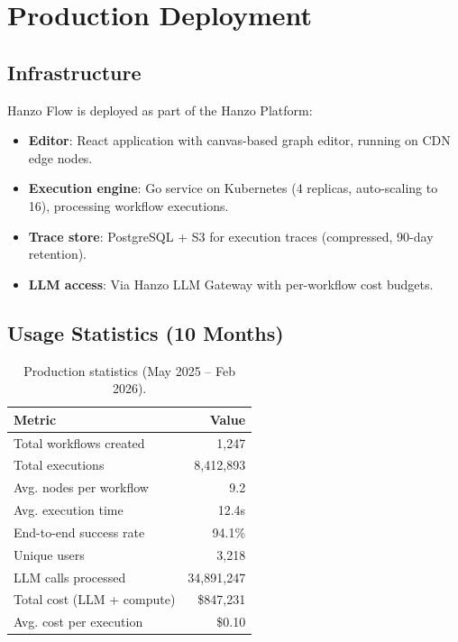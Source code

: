 \section{Production Deployment}

\label{sec:production}

\subsection{Infrastructure}

Hanzo Flow is deployed as part of the Hanzo Platform:

\begin{itemize}[leftmargin=1.1em]
    \item \textbf{Editor}: React application with canvas-based graph editor, running on CDN edge nodes.
    \item \textbf{Execution engine}: Go service on Kubernetes (4 replicas, auto-scaling to 16), processing workflow executions.
    \item \textbf{Trace store}: PostgreSQL + S3 for execution traces (compressed, 90-day retention).
    \item \textbf{LLM access}: Via Hanzo LLM Gateway with per-workflow cost budgets.
\end{itemize}

\subsection{Usage Statistics (10 Months)}

\begin{table}[H]
\centering
\begin{tabular}{lr}
\toprule
\textbf{Metric} & \textbf{Value} \\
\midrule
Total workflows created & 1,247 \\
Total executions & 8,412,893 \\
Avg. nodes per workflow & 9.2 \\
Avg. execution time & 12.4s \\
End-to-end success rate & 94.1\% \\
Unique users & 3,218 \\
LLM calls processed & 34,891,247 \\
Total cost (LLM + compute) & \$847,231 \\
Avg. cost per execution & \$0.10 \\
\bottomrule
\end{tabular}
\caption{Production statistics (May 2025 -- Feb 2026).}
\label{tab:prod_stats}
\end{table}

